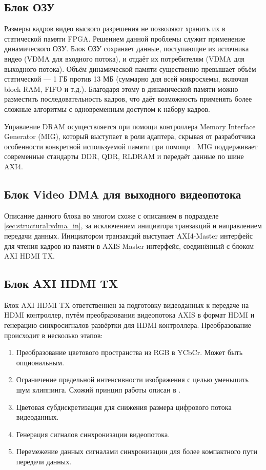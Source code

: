 \subsection{Блок ОЗУ}
\label{sec:structural:ram}
Размеры кадров видео выского разрешения не позволяют хранить их в статической памяти FPGA. Решением данной проблемы
служит применение динамического ОЗУ. Блок ОЗУ сохраняет данные, поступающие из источника видео (VDMA для входного потока), и отдаёт
их потребителям (VDMA для выходного потока). Объём динамической памяти существенно превышает объём статической ---
1 ГБ против 13 МБ (суммарно для всей микросхемы, включая block RAM, FIFO и т.д.). Благодаря этому в динамической памяти можно разместить
последовательность кадров, что даёт возможность применять более сложные алгоритмы с одновременным доступом к набору кадров.

Управление DRAM осуществляется при помощи контроллера Memory Interface Generator (MIG), который выступает в роли адаптера, скрывая
от разработчика особенности конкретной используемой памяти при помощи . MIG поддерживает современные
стандарты DDR, QDR, RLDRAM и передаёт данные по шине AXI4.

\subsection{Блок Video DMA для выходного видеопотока}
\label{sec:structural:vdma_out}
Описание данного блока во многом схоже с описанием в подразделе \ref{sec:structural:vdma_in},
за исключением инициатора транзакций и направлением передачи данных. Инициатором транзакций выступает
AXI4-Master интерфейс для чтения кадров из памяти в AXIS Master интерфейс, соединённый с блоком AXI HDMI TX.

\subsection{Блок AXI HDMI TX}
\label{sec:structural:axi_hdmi_tx}
Блок AXI HDMI TX ответственнен за подготовку видеоданных к передаче на HDMI контроллер, путём
преобразования видеопотока AXIS в формат HDMI и генерацию синхросигналов развёртки для HDMI контроллера.
Преобразование происходит в несколько этапов:
\begin{enumerate}[label={\arabic*}]
  \item Преобразование цветового пространства из RGB в YCbCr. Может быть опциональным.
  \item Ограничение предельной интенсивности изображения с целью уменьшить шум клиппинга.
    Схожий принцип работы описан в \cite{ycbcr_to_rgb_converter}.
  \item Цветовая субдискретизация для снижения размера цифрового потока видеоданных.
  \item Генерация сигналов синхронизации видеопотока.
  \item Перемежение данных сигналами синхронизации для более компактного пути передачи данных.
  \end{enumerate}

